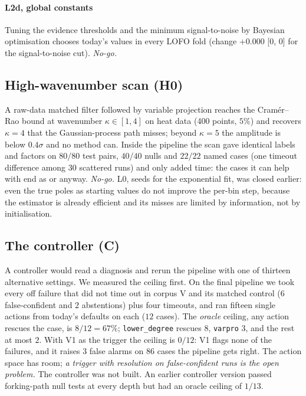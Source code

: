 \paragraph{L2d, global constants} Tuning the evidence thresholds and the minimum signal-to-noise by Bayesian optimisation chooses today's values in every LOFO fold
(change $+0.000$ [$0$, $0$] for the signal-to-noise cut). \emph{No-go.}

\subsection{High-wavenumber scan (H0)}\label{sec:highk}
A raw-data matched filter followed by variable projection reaches the Cram\'er--Rao bound at wavenumber $\kappa\in[1,4]$ on heat data (400 points, $5\%$) and recovers
$\kappa=4$ that the Gaussian-process path misses; beyond $\kappa=5$ the amplitude is below $0.4\sigma$ and no method can. Inside the pipeline the scan gave identical labels and factors on
$80/80$ test pairs, $40/40$ nulls and $22/22$ named cases (one timeout difference among $30$ scattered runs) and only added time: the cases it can help with end as \IDK{} or \UND{} anyway. \emph{No-go.}
L0, seeds for the exponential fit, was closed earlier: even the true poles as starting values do not improve the per-bin step, because the estimator is already efficient and its misses are
limited by information, not by initialisation.

\subsection{The controller (C)}\label{sec:controller}
A controller would read a diagnosis and rerun the pipeline with one of thirteen alternative settings. We measured the ceiling first. On the final pipeline we took every off failure that
did not time out in corpus V and its matched control ($6$ false-confident and $2$ abstentions) plus four timeouts, and ran fifteen single actions from today's defaults on each ($12$ cases).
The \emph{oracle} ceiling, any action rescues the case, is $8/12=67\%$; \texttt{lower\_degree} rescues $8$, \texttt{varpro} $3$, and the rest at most $2$. With V1 as the trigger the ceiling is
$0/12$: V1 flags none of the failures, and it raises $3$ false alarms on $86$ cases the pipeline gets right. The action space has room; \emph{a trigger with resolution on false-confident runs is the open problem.}
The controller was not built. An earlier controller version passed forking-path null tests at every depth but had an oracle ceiling of $1/13$.


